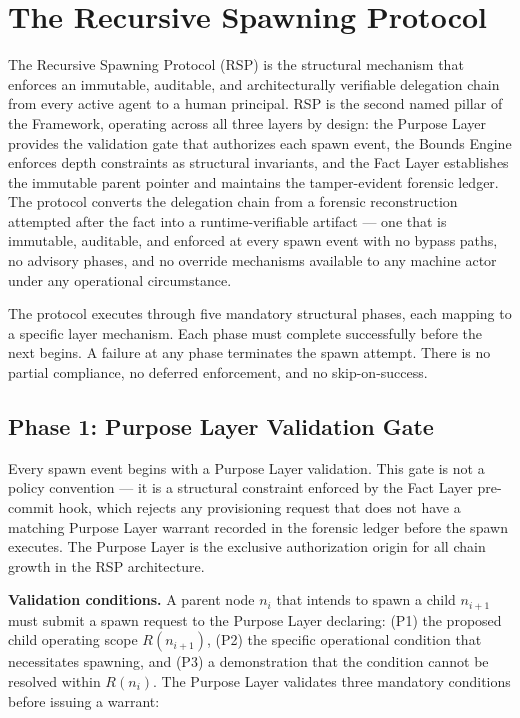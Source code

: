 \section{The Recursive Spawning Protocol}
\label{sec:rs-protocol}

The Recursive Spawning Protocol (RSP) is the structural mechanism that enforces an immutable, auditable, and architecturally verifiable delegation chain from every active agent to a human principal. RSP is the second named pillar of the \bxthree{} Framework, operating across all three layers by design: the Purpose Layer provides the validation gate that authorizes each spawn event, the Bounds Engine enforces depth constraints as structural invariants, and the Fact Layer establishes the immutable parent pointer and maintains the tamper-evident forensic ledger. The protocol converts the delegation chain from a forensic reconstruction attempted after the fact into a runtime-verifiable artifact --- one that is immutable, auditable, and enforced at every spawn event with no bypass paths, no advisory phases, and no override mechanisms available to any machine actor under any operational circumstance.

The protocol executes through five mandatory structural phases, each mapping to a specific \bxthree{} layer mechanism. Each phase must complete successfully before the next begins. A failure at any phase terminates the spawn attempt. There is no partial compliance, no deferred enforcement, and no skip-on-success.

\subsection{Phase 1: Purpose Layer Validation Gate}
\label{sec:rs-phase1-purpose}

Every spawn event begins with a Purpose Layer validation. This gate is not a policy convention --- it is a structural constraint enforced by the Fact Layer pre-commit hook, which rejects any provisioning request that does not have a matching Purpose Layer warrant recorded in the forensic ledger before the spawn executes. The Purpose Layer is the exclusive authorization origin for all chain growth in the RSP architecture.

\medskip
\noindent\textbf{Validation conditions.} A parent node $n_i$ that intends to spawn a child $n_{i+1}$ must submit a spawn request to the Purpose Layer declaring: (P1) the proposed child operating scope $R(n_{i+1})$, (P2) the specific operational condition that necessitates spawning, and (P3) a demonstration that the condition cannot be resolved within $R(n_i)$. The Purpose Layer validates three mandatory conditions before issuing a warrant:

